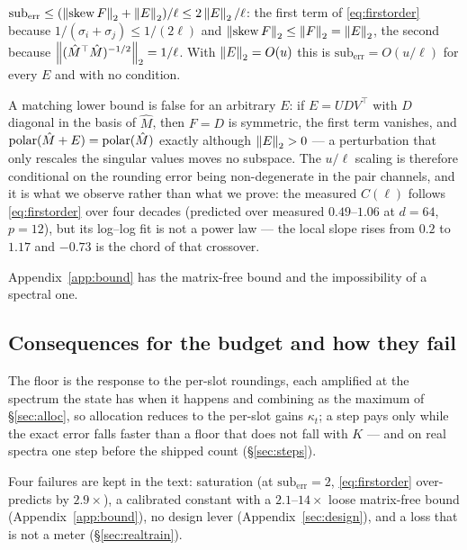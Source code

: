 \begin{corollary}
\label{cor:scale}
$\mathrm{sub}_{\mathrm{err}} \le (\left\lVert \operatorname{skew} F \right\rVert_2 + \left\lVert E \right\rVert_2)/\ell \le
2\left\lVert E \right\rVert_2/\ell$: the first term of \eqref{eq:firstorder} because
$1/(\sigma_i+\sigma_j)\le1/(2\ell)$ and $\left\lVert \operatorname{skew} F \right\rVert_2\le\left\lVert F \right\rVert_2=\left\lVert E \right\rVert_2$, the
second because $\left\lVert (\hat M^\top\hat M)^{-1/2} \right\rVert_2 = 1/\ell$.  With
$\left\lVert E \right\rVert_2=O(u)$ this is $\mathrm{sub}_{\mathrm{err}}=O(u/\ell)$ for every $E$ and with no
condition.

A matching lower bound is false for an arbitrary $E$: if $E=UDV^\top$ with $D$ diagonal in
the basis of $\hat M$, then $F=D$ is symmetric, the first term vanishes, and
$\operatorname{polar}(\hat M+E)=\operatorname{polar}(\hat M)$ exactly although $\left\lVert E \right\rVert_2>0$ --- a perturbation that
only rescales the singular values moves no subspace.  The $u/\ell$ scaling is therefore
conditional on the rounding error being non-degenerate in the pair channels, and
it is what we observe rather than what we prove: the measured $C(\ell)$ follows
\eqref{eq:firstorder} over four decades (predicted over measured $0.49$--$1.06$ at
$d=64$, $p=12$), but its log--log fit is not a power law --- the local slope rises from
$0.2$ to $1.17$ and $-0.73$ is the chord of that crossover.
\end{corollary}

Appendix~\ref{app:bound} has the matrix-free bound and the impossibility of a spectral one.

\subsection{Consequences for the budget and how they fail}
\label{sec:consequences}

The floor is the response to the per-slot roundings, each amplified at the spectrum the
state has when it happens and combining as the maximum of \S\ref{sec:alloc}, so allocation
reduces to the per-slot gains $\kappa_t$; a step pays only while the exact error falls
faster than a floor that does not fall with $K$ --- and on real spectra one step before the
shipped count (\S\ref{sec:steps}).

\label{sec:failures}
Four failures are kept in the text: saturation (at $\mathrm{sub}_{\mathrm{err}}=2$,
\eqref{eq:firstorder} over-predicts by $2.9\times$), a calibrated constant with a
$2.1$--$14\times$ loose matrix-free bound (Appendix~\ref{app:bound}), no design lever
(Appendix~\ref{sec:design}), and a loss that is not a meter (\S\ref{sec:realtrain}).
